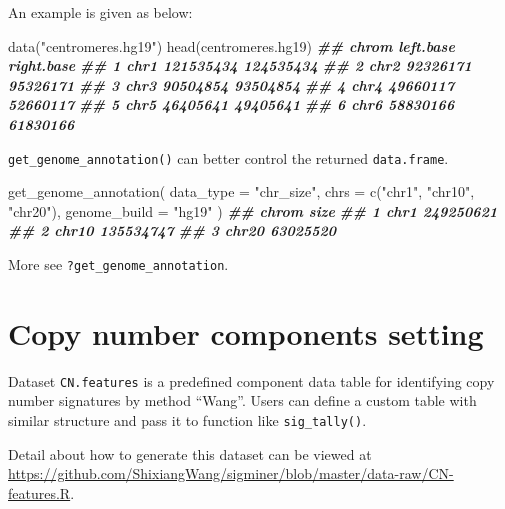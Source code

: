 \documentclass[
  12pt,
  a4paper,
  twoside]{book}
\newenvironment{Shaded}{\begin{snugshade}}{\end{snugshade}}
\newcommand{\AttributeTok}[1]{\textcolor[rgb]{0.77,0.63,0.00}{#1}}
\newcommand{\DocumentationTok}[1]{\textcolor[rgb]{0.56,0.35,0.01}{\textbf{\textit{#1}}}}
\newcommand{\FunctionTok}[1]{\textcolor[rgb]{0.00,0.00,0.00}{#1}}
\newcommand{\NormalTok}[1]{#1}
\newcommand{\StringTok}[1]{\textcolor[rgb]{0.31,0.60,0.02}{#1}}
\begin{document}
An example is given as below:

\begin{Shaded}
\begin{Highlighting}[]
\FunctionTok{data}\NormalTok{(}\StringTok{"centromeres.hg19"}\NormalTok{)}
\FunctionTok{head}\NormalTok{(centromeres.hg19)}
\DocumentationTok{\#\#   chrom left.base right.base}
\DocumentationTok{\#\# 1  chr1 121535434  124535434}
\DocumentationTok{\#\# 2  chr2  92326171   95326171}
\DocumentationTok{\#\# 3  chr3  90504854   93504854}
\DocumentationTok{\#\# 4  chr4  49660117   52660117}
\DocumentationTok{\#\# 5  chr5  46405641   49405641}
\DocumentationTok{\#\# 6  chr6  58830166   61830166}
\end{Highlighting}
\end{Shaded}

\texttt{get\_genome\_annotation()} can better control the returned \texttt{data.frame}.

\begin{Shaded}
\begin{Highlighting}[]
\FunctionTok{get\_genome\_annotation}\NormalTok{(}
  \AttributeTok{data\_type =} \StringTok{"chr\_size"}\NormalTok{,}
  \AttributeTok{chrs =} \FunctionTok{c}\NormalTok{(}\StringTok{"chr1"}\NormalTok{, }\StringTok{"chr10"}\NormalTok{, }\StringTok{"chr20"}\NormalTok{),}
  \AttributeTok{genome\_build =} \StringTok{"hg19"}
\NormalTok{)}
\DocumentationTok{\#\#   chrom      size}
\DocumentationTok{\#\# 1  chr1 249250621}
\DocumentationTok{\#\# 2 chr10 135534747}
\DocumentationTok{\#\# 3 chr20  63025520}
\end{Highlighting}
\end{Shaded}

More see \texttt{?get\_genome\_annotation}.

\hypertarget{copy-number-components-setting}{%
\section{Copy number components setting}\label{copy-number-components-setting}}

Dataset \texttt{CN.features} is a predefined component data table for identifying copy number signatures by method ``Wang''.
Users can define a custom table with similar structure and pass it to function like \texttt{sig\_tally()}.

Detail about how to generate this dataset can be viewed at \url{https://github.com/ShixiangWang/sigminer/blob/master/data-raw/CN-features.R}.
\end{document}
